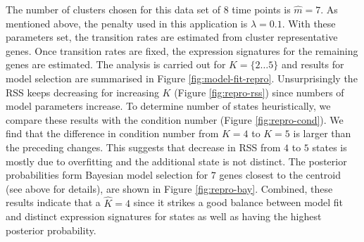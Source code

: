 The number of clusters chosen for this data set of $8$ time points is $\hat{m} = 7$. As mentioned above, the penalty used in this application is $\lambda = 0.1$. With these parameters set, the transition rates are estimated from cluster representative genes. Once transition rates are fixed, the expression signatures for the remaining genes are estimated. The analysis is carried out for $K = \lbrace 2 \ldots 5 \rbrace $ and results for model selection are summarised in Figure \ref{fig:model-fit-repro}. Unsurprisingly the RSS keeps decreasing for increasing $K$ (Figure \ref{fig:repro-rss}) since numbers of model parameters increase. To determine number of states heuristically, we compare these results with the condition number (Figure \ref{fig:repro-cond}). We find that the difference in condition number from $K=4$ to $K=5$ is larger than the preceding changes. This suggests that decrease in RSS from $4$ to $5$ states is mostly due to overfitting and the additional state is not distinct. The posterior probabilities form Bayesian model selection for $7$  genes closest to the centroid (see above for details), are shown in Figure \ref{fig:repro-bay}. Combined, these results indicate that a $\hat{K} = 4$ since it strikes a good balance between model fit and distinct expression signatures for states as well as having the highest posterior probability. 


